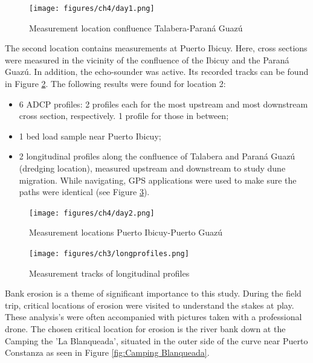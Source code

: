 \begin{figure}[H]
    \centering
    \texttt{[image: figures/ch4/day1.png]}
    \caption{Measurement location confluence Talabera-Paraná Guazú \autocite{googleGoogleEarth2025}}
    \label{fig:measurements day1}
\end{figure}

\vspace{0.2cm}
The second location contains measurements at Puerto Ibicuy. Here, cross sections were measured in the vicinity of the confluence of the Ibicuy and the Paraná Guazú. In addition, the echo-sounder was active. Its recorded tracks can be found in Figure \ref{fig:measurements day2}. The following results were found for location 2:
\begin{itemize}
    \item 6 ADCP profiles: 2 profiles each for the most upstream and most downstream cross section, respectively. 1 profile for those in between; 
    \item 1 bed load sample near Puerto Ibicuy;
    \item 2 longitudinal profiles along the confluence of Talabera and Paraná Guazú (dredging location), measured upstream and downstream to study dune migration. While navigating, GPS applications were used to make sure the paths were identical (see Figure \ref{fig:longprofiles map}).
\end{itemize}

\begin{figure}[H]
    \centering
    \texttt{[image: figures/ch4/day2.png]}
    \caption{Measurement locations Puerto Ibicuy-Puerto Guazú \autocite{googleGoogleEarth2025}}
    \label{fig:measurements day2}
\end{figure}

\begin{figure}[H]
    \centering
    \texttt{[image: figures/ch3/longprofiles.png]}
    \caption{Measurement tracks of longitudinal profiles \autocite{googleGoogleEarth2025}}
    \label{fig:longprofiles map}
\end{figure}

Bank erosion is a theme of significant importance to this study. During the field trip, critical locations of erosion were visited to understand the stakes at play. These analysis's were often accompanied with pictures taken with a professional drone. The chosen critical location for erosion is the river bank down at the Camping the 'La Blanqueada', situated in the outer side of the curve near Puerto Constanza as seen in Figure \ref{fig:Camping Blanqueada}.

